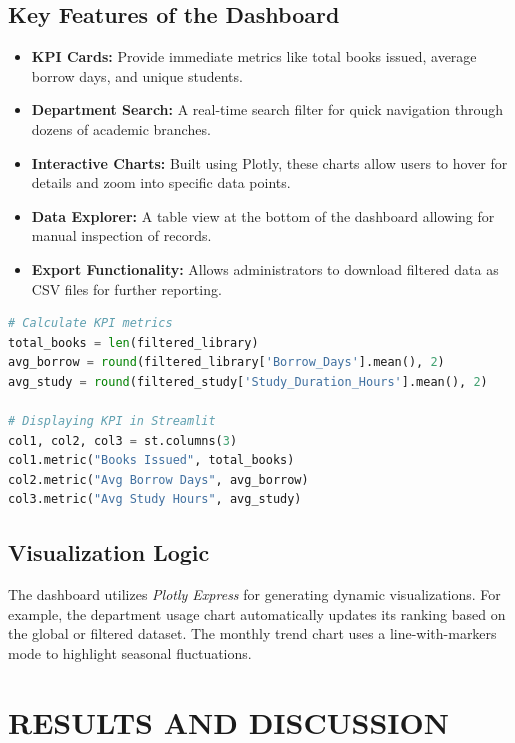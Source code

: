 \documentclass[12pt,a4paper]{report}
\begin{document}
\section{Key Features of the Dashboard}
\begin{itemize}
    \item \textbf{KPI Cards:} Provide immediate metrics like total books issued, average borrow days, and unique students.
    \item \textbf{Department Search:} A real-time search filter for quick navigation through dozens of academic branches.
    \item \textbf{Interactive Charts:} Built using Plotly, these charts allow users to hover for details and zoom into specific data points.
    \item \textbf{Data Explorer:} A table view at the bottom of the dashboard allowing for manual inspection of records.
    \item \textbf{Export Functionality:} Allows administrators to download filtered data as CSV files for further reporting.
\end{itemize}

\begin{lstlisting}[language=Python, caption=Dashboard KPI Implementation]
# Calculate KPI metrics
total_books = len(filtered_library)
avg_borrow = round(filtered_library['Borrow_Days'].mean(), 2)
avg_study = round(filtered_study['Study_Duration_Hours'].mean(), 2)

# Displaying KPI in Streamlit
col1, col2, col3 = st.columns(3)
col1.metric("Books Issued", total_books)
col2.metric("Avg Borrow Days", avg_borrow)
col3.metric("Avg Study Hours", avg_study)
\end{lstlisting}

\section{Visualization Logic}
The dashboard utilizes \textit{Plotly Express} for generating dynamic visualizations. For example, the department usage chart automatically updates its ranking based on the global or filtered dataset. The monthly trend chart uses a line-with-markers mode to highlight seasonal fluctuations.

\chapter{RESULTS AND DISCUSSION}
\end{document}
